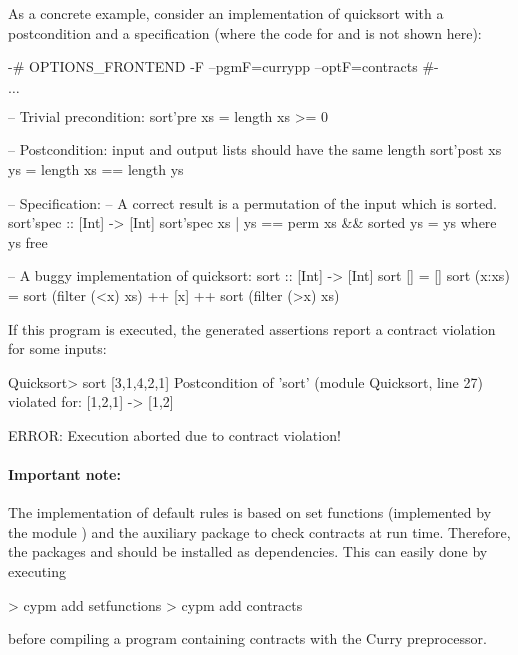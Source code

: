 As a concrete example, consider an implementation of quicksort
with a postcondition and a specification
(where the code for  and  is not shown here):
%
\begin{curry}
{-# OPTIONS_FRONTEND -F --pgmF=currypp --optF=contracts #-}

$\ldots$

-- Trivial precondition:
sort'pre xs = length xs >= 0

-- Postcondition: input and output lists should have the same length
sort'post xs ys = length xs == length ys

-- Specification:
-- A correct result is a permutation of the input which is sorted.
sort'spec :: [Int] -> [Int]
sort'spec xs | ys == perm xs && sorted ys = ys  where ys free

-- A buggy implementation of quicksort:
sort :: [Int] -> [Int]
sort []     = []
sort (x:xs) = sort (filter (<x) xs) ++ [x] ++ sort (filter (>x) xs)
\end{curry}
%
If this program is executed, the generated assertions report
a contract violation for some inputs:
%
\begin{curry}
Quicksort> sort [3,1,4,2,1]
Postcondition of 'sort' (module Quicksort, line 27) violated for:
[1,2,1] -> [1,2]

ERROR: Execution aborted due to contract violation!
\end{curry}

\paragraph{Important note:}
The implementation of default rules is based on set functions
(implemented by the module ) and
the auxiliary package to check contracts at run time.
Therefore, the packages  and 
should be installed as dependencies.
This can easily done by executing
%
\begin{curry}
> cypm add setfunctions
> cypm add contracts
\end{curry}
%
before compiling a program containing contracts with the
Curry preprocessor.



